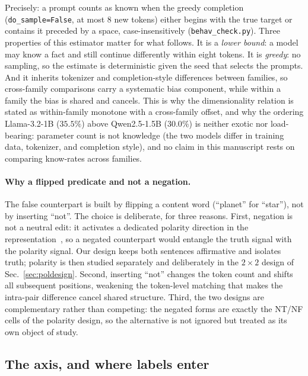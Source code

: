 \documentclass[11pt]{article}
\begin{document}
Precisely: a prompt counts as known when the greedy completion
(\texttt{do\_sample=False}, at most $8$ new tokens) either begins with the
true target or contains it preceded by a space, case-insensitively
(\texttt{behav\_check.py}). Three properties of this estimator matter for
what follows. It is a \emph{lower bound}: a model may know a fact and
still continue differently within eight tokens. It is \emph{greedy}: no
sampling, so the estimate is deterministic given the seed that selects the
prompts. And it inherits tokenizer and completion-style differences
between families, so cross-family comparisons carry a systematic bias
component, while within a family the bias is shared and cancels. This is
why the dimensionality relation is stated as within-family monotone with a
cross-family offset, and why the ordering Llama-3.2-1B ($35.5\%$) above
Qwen2.5-1.5B ($30.0\%$) is neither exotic nor load-bearing: parameter
count is not knowledge (the two models differ in training data, tokenizer,
and completion style), and no claim in this manuscript rests on comparing
know-rates across families.



\paragraph{Why a flipped predicate and not a negation.} The false counterpart
is built by flipping a content word (``planet'' for ``star''), not by
inserting ``not''. The choice is deliberate, for three reasons. First,
negation is not a neutral edit: it activates a dedicated polarity direction in
the representation~\cite{burger2024}, so a negated counterpart would entangle
the truth signal with the polarity signal. Our design keeps both sentences
affirmative and isolates truth; polarity is then studied separately and
deliberately in the $2{\times}2$ design of Sec.~\ref{sec:poldesign}. Second,
inserting ``not'' changes the token count and shifts all subsequent positions,
weakening the token-level matching that makes the intra-pair difference
cancel shared structure. Third, the two designs are complementary rather than
competing: the negated forms are exactly the NT/NF cells of the polarity
design, so the alternative is not ignored but treated as its own object of
study.

\subsection{The axis, and where labels enter}
\label{sec:axis}
\end{document}
